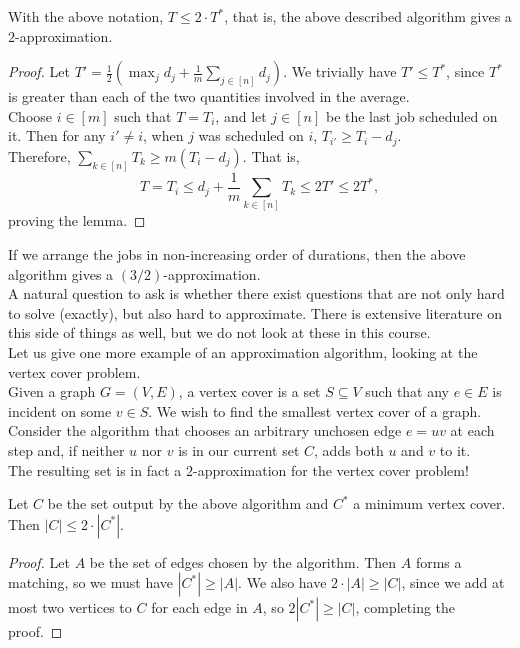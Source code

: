 	\begin{lemma}
		With the above notation, $T \leq 2\cdot T^*$, that is, the above described algorithm gives a $2$-approximation.
	\end{lemma}
	\begin{proof}
		Let $T' = \frac{1}{2} \left(\max_j d_j + \frac{1}{m} \sum_{j\in[n]} d_j\right)$. We trivially have $T' \leq T^*$, since $T^*$ is greater than each of the two quantities involved in the average.\\
		Choose $i\in[m]$ such that $T = T_i$, and let $j\in[n]$ be the last job scheduled on it. Then for any $i' \neq i$, when $j$ was scheduled on $i$, $T_{i'} \geq T_i - d_j$.\\
		Therefore, $\sum_{k\in[n]} T_k \geq m(T_i - d_j)$. That is,
		\[ T = T_i \leq d_j + \frac{1}{m} \sum_{k\in[n]} T_k \leq 2T' \leq 2T^*, \]
		proving the lemma.
	\end{proof}

	If we arrange the jobs in non-increasing order of durations, then the above algorithm gives a $(3/2)$-approximation.\\

	A natural question to ask is whether there exist questions that are not only hard to solve (exactly), but also hard to approximate. There is extensive literature on this side of things as well, but we do not look at these in this course.\\

	Let us give one more example of an approximation algorithm, looking at the vertex cover problem.\\
	Given a graph $G=(V,E)$, a vertex cover is a set $S\subseteq V$ such that any $e\in E$ is incident on some $v \in S$. We wish to find the smallest vertex cover of a graph.\\

	Consider the algorithm that chooses an arbitrary unchosen edge $e=uv$ at each step and, if neither $u$ nor $v$ is in our current set $C$, adds both $u$ and $v$ to it.\\
	The resulting set is in fact a $2$-approximation for the vertex cover problem!

	\begin{lemma}
		Let $C$ be the set output by the above algorithm and $C^*$ a minimum vertex cover. Then $|C| \leq 2\cdot|C^*|$.
	\end{lemma}
	\begin{proof}
		Let $A$ be the set of edges chosen by the algorithm. Then $A$ forms a matching, so we must have $|C^*| \geq |A|$. We also have $2\cdot|A| \geq |C|$, since we add at most two vertices to $C$ for each edge in $A$, so $2|C^*| \geq |C|$, completing the proof.
	\end{proof}

